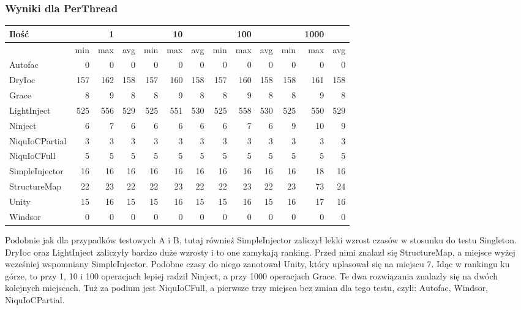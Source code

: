 \documentclass[12pt]{article}
\begin{document}
\subsubsection{Wyniki dla PerThread}
\begin{center}
\begin{small}
	\begin{tabular}{ | l | r r r | r r r | r r r | r r r | }
    		\hline
Ilość & & 1 & & & 10 & & & 100 & & & 1000 & \\ \hline
 & min & max & avg & min & max & avg & min & max & avg & min & max & avg \\ \hline
Autofac & 0 & 0 & 0 & 0 & 0 & 0 & 0 & 0 & 0 & 0 & 0 & 0 \\ \hline
DryIoc & 157 & 162 & 158 & 157 & 160 & 158 & 157 & 160 & 158 & 158 & 161 & 158 \\ \hline
Grace & 8 & 9 & 8 & 8 & 9 & 8 & 8 & 9 & 8 & 8 & 9 & 8 \\ \hline
LightInject & 525 & 556 & 529 & 525 & 551 & 530 & 525 & 558 & 530 & 525 & 550 & 529 \\ \hline
Ninject & 6 & 7 & 6 & 6 & 6 & 6 & 6 & 7 & 6 & 9 & 10 & 9 \\ \hline
NiquIoCPartial & 3 & 3 & 3 & 3 & 3 & 3 & 3 & 3 & 3 & 3 & 3 & 3 \\ \hline
NiquIoCFull & 5 & 5 & 5 & 5 & 5 & 5 & 5 & 5 & 5 & 5 & 5 & 5 \\ \hline
SimpleInjector & 16 & 16 & 16 & 16 & 16 & 16 & 16 & 16 & 16 & 16 & 18 & 16 \\ \hline
StructureMap & 22 & 23 & 22 & 22 & 23 & 22 & 22 & 23 & 22 & 23 & 73 & 24 \\ \hline
Unity & 15 & 16 & 15 & 15 & 16 & 15 & 15 & 16 & 15 & 16 & 17 & 16 \\ \hline
Windsor & 0 & 0 & 0 & 0 & 0 & 0 & 0 & 0 & 0 & 0 & 0 & 0 \\ \hline
  	\end{tabular}
\end{small}
\end{center}
Podobnie jak dla przypadków testowych A i B, tutaj również SimpleInjector zaliczył lekki wzrost czasów w stosunku do testu Singleton. DryIoc oraz LightInject zaliczyły bardzo duże wzrosty i to one zamykają ranking. Przed nimi znalazł się StructureMap, a miejsce wyżej wcześniej wspomniany SimpleInjector. Podobne czasy do niego zanotował Unity, który uplasował się na miejscu 7. Idąc w rankingu ku górze, to przy 1, 10 i 100 operacjach lepiej radził Ninject, a przy 1000 operacjach Grace. Te dwa rozwiązania znalazły się na dwóch kolejnych miejscach. Tuż za podium jest NiquIoCFull, a pierwsze trzy miejsca bez zmian dla tego testu, czyli: Autofac, Windsor, NiquIoCPartial.
\end{document}
